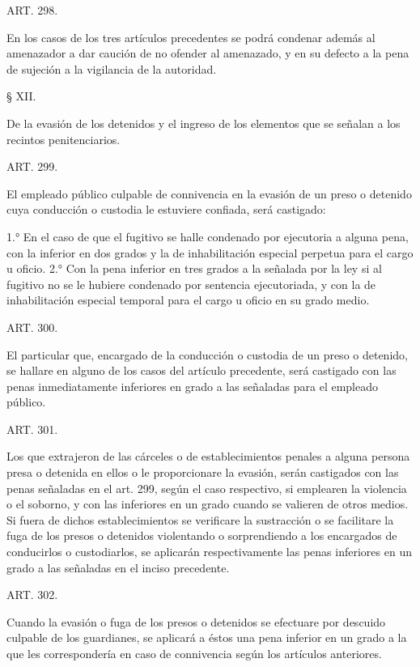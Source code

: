     ART. 298.

    En los casos de los tres artículos precedentes se podrá condenar además al amenazador a dar caución de no ofender al amenazado, y en su defecto a la pena de sujeción a la vigilancia de la autoridad.




    § XII.

    De la evasión de los detenidos y el ingreso de los elementos que se señalan a los recintos penitenciarios.








    ART. 299.

    El empleado público culpable de connivencia en la evasión de un preso o detenido cuya conducción o custodia le estuviere confiada, será castigado:

    1.° En el caso de que el fugitivo se halle condenado por ejecutoria a alguna pena, con la inferior en dos grados y la de inhabilitación especial perpetua para el cargo u oficio.
    2.° Con la pena inferior en tres grados a la señalada por la ley si al fugitivo no se le hubiere condenado por sentencia ejecutoriada, y con la de inhabilitación especial temporal para el cargo u oficio en su grado medio.

    ART. 300.

    El particular que, encargado de la conducción o custodia de un preso o detenido, se hallare en alguno de los casos del artículo precedente, será castigado con las penas inmediatamente inferiores en grado a las señaladas para el empleado público.


    ART. 301.

    Los que extrajeron de las cárceles o de establecimientos penales a alguna persona presa o detenida en ellos o le proporcionare la evasión, serán castigados con las penas señaladas en el art. 299, según el caso respectivo, si emplearen la violencia o el soborno, y con las inferiores en un grado cuando se valieren de otros medios.
    Si fuera de dichos establecimientos se verificare la sustracción o se facilitare la fuga de los presos o detenidos violentando o sorprendiendo a los encargados de conducirlos o custodiarlos, se aplicarán respectivamente las penas inferiores en un grado a las señaladas en el inciso precedente.


    ART. 302.

    Cuando la evasión o fuga de los presos o detenidos se efectuare por descuido culpable de los guardianes, se aplicará a éstos una pena inferior en un grado a la que les correspondería en caso de connivencia según los artículos anteriores.



